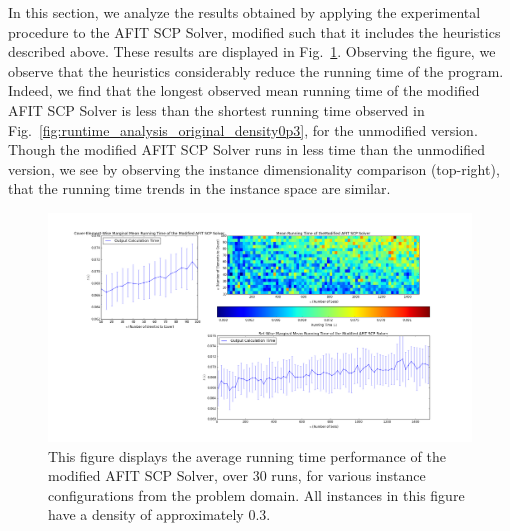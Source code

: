 \documentclass[12pt]{article}
\begin{document}
	In this section, we analyze the results obtained by applying the experimental procedure to the AFIT SCP Solver, modified such that it includes the heuristics described above. These results are displayed in Fig.~\ref{fig:runtime_analysis_modified_density0p3}. Observing the figure, we observe that the heuristics considerably reduce the running time of the program. Indeed, we find that the longest observed mean running time of the modified AFIT SCP Solver is less than the shortest running time observed in Fig.~\ref{fig:runtime_analysis_original_density0p3}, for the unmodified version. Though the modified AFIT SCP Solver runs in less time than the unmodified version, we see by observing the instance dimensionality comparison (top-right), that the running time trends in the instance space are similar.
	
	
	\begin{figure}[ht!]\label{fig:runtime_analysis_modified_density0p3}
		
		\centering
		\centerline{\includegraphics[width = 6.7in]{running_time_modified_density0p3_noout_noH1.png}}
		\hfill
		
		\caption{This figure displays the average running time performance of the modified AFIT SCP Solver, over $30$ runs, for various instance configurations from the problem domain. All instances in this figure have a density of approximately $0.3$.}
		
	\end{figure}
	
	
\end{document}
